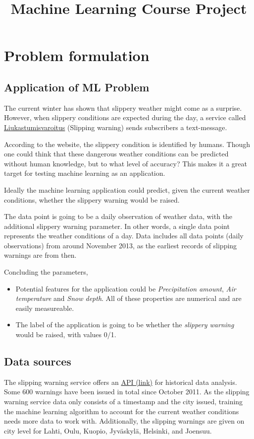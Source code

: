 \documentclass[12pt, a4paper]{report}
\title{Machine Learning Course Project}
\begin{document}
    \section{Problem formulation}
    \subsection{Application of ML Problem}
    The current winter has shown that slippery weather might come as a surprise.
    However, when slippery conditions are expected during the day, a service called \href{https://liukastumisvaroitus.fi/en/}{Liukastumisvaroitus} (Slipping warning) sends subscribers a text-message.

    According to the website, the slippery condition is identified by humans.
    Though one could think that these dangerous weather conditions can be predicted without 
    human knowledge, but to what level of accuracy? This makes it a great target for testing machine learning as an application.
    
    Ideally the machine learning application could predict, given the current weather conditions, whether the slippery warning would be raised.

    The data point is going to be a daily observation of weather data, with the additional
    slippery warning parameter. In other words, a single data point represents the weather conditions of a day. Data includes all data points (daily observations) from around 
    November 2013, as the earliest records of slipping warnings are from then.

    Concluding the parameters, 
    \begin{itemize}
      \item Potential features for the application could be \textit{Precipitation amount}, \textit{Air temperature} and \textit{Snow depth}. All of these properties are numerical and are easily measureable.
      \item The label of the application is going to be whether the \textit{slippery warning} would be raised, with values 0/1.
    \end{itemize}
    

    \subsection{Data sources}
    The slipping warning service offers an \href{https://liukastumisvaroitus-api.beze.io/api/v1/warnings/}{API (link)} for historical data analysis. Some 600 warnings have been issued in total since October 2011.
    As the slipping warning service data only consists of a timestamp and the city issued, training the machine learning algorithm to account for the current weather conditions needs more data to work with.
    Additionally, the slipping warnings are given on city level for Lahti, Oulu, Kuopio, Jyväskylä, Helsinki, and Joensuu.
\end{document}
